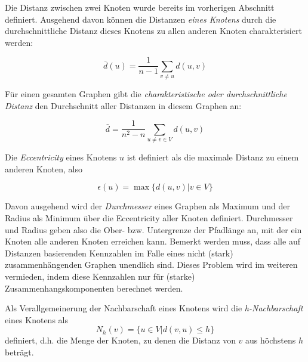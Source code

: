 Die Distanz zwischen zwei Knoten wurde bereits im vorherigen Abschnitt
definiert. Ausgehend davon können die Distanzen \emph{eines Knotens}
durch die durchschnittliche Distanz dieses Knotens zu allen anderen
Knoten charakterisiert werden:

\begin{equation}
  \label{eq:1}
  \bar{d}(u) = \frac{1}{n-1} \sum_{v \ne u} d(u, v)
\end{equation}

Für einen gesamten Graphen gibt die \emph{charakteristische oder
  durchschnittliche Distanz} den Durchschnitt aller Distanzen in
diesem Graphen an:

\begin{equation}
  \label{eq:2}
  \bar{d} = \frac{1}{n^2 - n} \sum_{u \ne v \in V} d(u, v)
\end{equation}

Die \emph{Eccentricity} eines Knotens $u$ ist definiert als die
maximale Distanz zu einem anderen Knoten, also

\begin{equation}
  \label{eq:3}
  \epsilon(u) = \max\{d(u,v) | v \in V\}
\end{equation}

Davon ausgehend  wird der \emph{Durchmesser} eines Graphen als Maximum
und der Radius als Minimum über die Eccentricity aller Knoten
definiert. Durchmesser und Radius geben also die Ober-
bzw. Untergrenze der Pfadlänge an, mit der ein Knoten alle anderen
Knoten erreichen kann. Bemerkt werden muss, dass alle auf Distanzen
basierenden Kennzahlen im Falle eines nicht (stark)
zusammenhängenden Graphen unendlich sind. Dieses Problem wird im
weiteren vermieden, indem diese Kennzahlen nur für (starke)
Zusammenhangskomponenten berechnet werden.

Als Verallgemeinerung der Nachbarschaft eines Knotens wird die
\emph{h-Nachbarschaft} eines Knotens als
\begin{equation}
  \label{eq:4}
  N_h(v) = \{ u \in V | d(v, u) \le h \}
\end{equation}
definiert, d.h. die Menge der Knoten, zu denen die Distanz von $v$ aus
höchstens $h$ beträgt.


